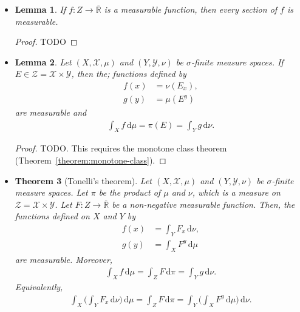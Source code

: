 \documentclass[10pt]{article}
\newtheorem{lemma}{Lemma}
\newtheorem{theorem}[lemma]{Theorem}
\newcommand{\dee}{\mathrm{d}}
\newcommand{\mcal}[1]{\mathcal{#1}}
\newcommand{\Real}{\mathbb{R}}
\begin{document}
\begin{itemize}
  \item \begin{lemma}
    If $f: Z \rightarrow \overline{\Real}$ is a measurable function, then every section of $f$ is measurable.
  \end{lemma}

  \begin{proof}
    TODO
  \end{proof}  

  \item \begin{lemma}
    Let $(X,\mcal{X},\mu)$ and $(Y, \mcal{Y}, \nu)$ be $\sigma$-finite measure spaces. If $E \in \mcal{Z} = \mcal{X} \times \mcal{Y}$, then the; functions defined by
    \begin{align*}
      f(x) &= \nu(E_x),\\
      g(y) &= \mu(E^y)
    \end{align*}
    are measurable and
    \begin{align*}
      \int_X f\, \dee\mu = \pi(E) = \int_Y g\, \dee \nu.
    \end{align*}
  \end{lemma}

  \begin{proof}
    TODO. This requires the monotone class theorem (Theorem~\ref{theorem:monotone-class}).
  \end{proof}  

  \item \begin{theorem}[Tonelli's theorem]
    Let $(X,\mcal{X},\mu)$ and $(Y, \mcal{Y}, \nu)$ be $\sigma$-finite measure spaces. Let $\pi$ be the product of $\mu$ and $\nu$, which is a measure on $\mcal{Z} = \mcal{X} \times \mcal{Y}$. Let $F: Z \rightarrow \overline{\Real}$ be a non-negative measurable function. Then, the functions defined on $X$ and $Y$ by
    \begin{align*}
      f(x) &= \int_Y F_x\, \dee\nu, \\
      g(y) &= \int_X F^y\, \dee\mu
    \end{align*}
    are measurable. Moreover,
    \begin{align*}
      \int_X f\, \dee\mu = \int_Z F\, \dee\pi = \int_Y g\,\dee\nu.
    \end{align*}
    Equivalently,
    \begin{align*}
      \int_X \bigg( \int_Y F_x\, \dee\nu \bigg)\, \dee\mu = \int_Z F\, \dee\pi = \int_Y \bigg( \int_X F^y\, \dee\mu \bigg)\,\dee\nu.
    \end{align*}
  \end{theorem}


\end{itemize}
\end{document}
